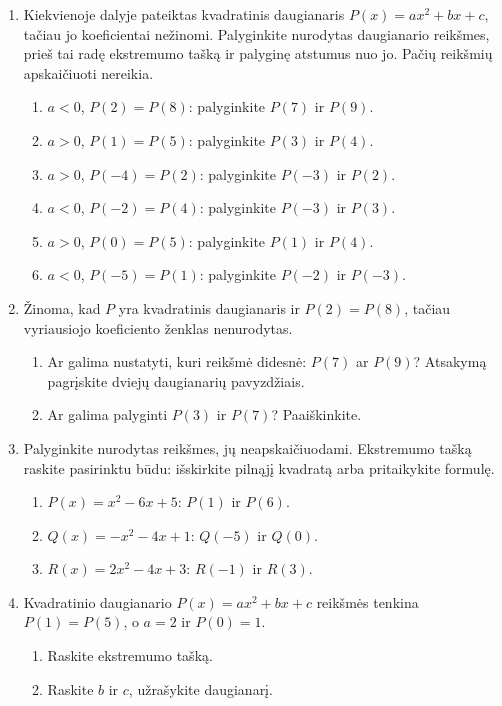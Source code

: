 \documentclass[12pt,a4paper]{article}
\begin{document}
\begin{enumerate}
\begin{enumerate}
\end{enumerate}
\par\medskip
\textbf{Sustokite ir apibendrinkite.} Kaip atstumai iki ekstremumo taško ir $a$ ženklas padeda palyginti daugianario reikšmes?
\item Kiekvienoje dalyje pateiktas kvadratinis daugianaris $P(x)=ax^2+bx+c$, tačiau jo koeficientai nežinomi. Palyginkite nurodytas daugianario reikšmes, prieš tai radę ekstremumo tašką ir palyginę atstumus nuo jo. Pačių reikšmių apskaičiuoti nereikia.
\begin{enumerate}
\item $a<0$, $P(2)=P(8)$: palyginkite $P(7)$ ir $P(9)$.
\item $a>0$, $P(1)=P(5)$: palyginkite $P(3)$ ir $P(4)$.
\item $a>0$, $P(-4)=P(2)$: palyginkite $P(-3)$ ir $P(2)$.
\item $a<0$, $P(-2)=P(4)$: palyginkite $P(-3)$ ir $P(3)$.
\item $a>0$, $P(0)=P(5)$: palyginkite $P(1)$ ir $P(4)$.
\item $a<0$, $P(-5)=P(1)$: palyginkite $P(-2)$ ir $P(-3)$.
\end{enumerate}
\item Žinoma, kad $P$ yra kvadratinis daugianaris ir $P(2)=P(8)$, tačiau vyriausiojo koeficiento ženklas nenurodytas.
\begin{enumerate}
\item Ar galima nustatyti, kuri reikšmė didesnė: $P(7)$ ar $P(9)$? Atsakymą pagrįskite dviejų daugianarių pavyzdžiais.
\item Ar galima palyginti $P(3)$ ir $P(7)$? Paaiškinkite.
\end{enumerate}
\item Palyginkite nurodytas reikšmes, jų neapskaičiuodami. Ekstremumo tašką raskite pasirinktu būdu: išskirkite pilnąjį kvadratą arba pritaikykite formulę.
\begin{enumerate}
\item $P(x)=x^2-6x+5$: $P(1)$ ir $P(6)$.
\item $Q(x)=-x^2-4x+1$: $Q(-5)$ ir $Q(0)$.
\item $R(x)=2x^2-4x+3$: $R(-1)$ ir $R(3)$.
\end{enumerate}
\item Kvadratinio daugianario $P(x)=ax^2+bx+c$ reikšmės tenkina $P(1)=P(5)$, o $a=2$ ir $P(0)=1$.
\begin{enumerate}
\item Raskite ekstremumo tašką.
\item Raskite $b$ ir $c$, užrašykite daugianarį.

\end{enumerate}
\end{enumerate}
\end{document}
